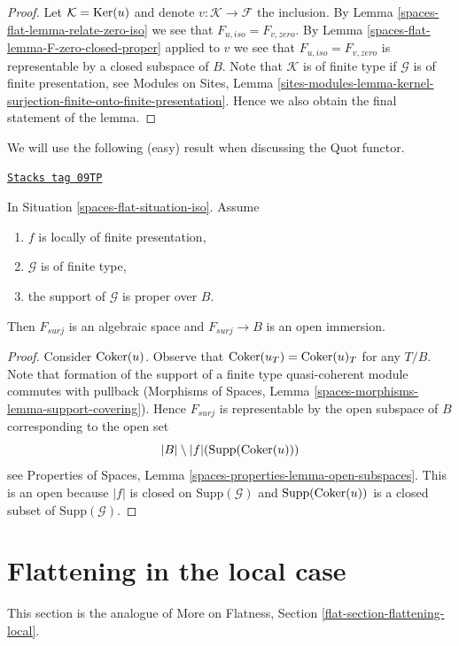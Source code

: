 \begin{proof}
Let $\mathcal{K} = \operatorname{Ker}(u)$ and denote $v : \mathcal{K} \to \mathcal{F}$
the inclusion. By Lemma \ref{spaces-flat-lemma-relate-zero-iso} we see that
$F_{u, iso} = F_{v, zero}$. By Lemma \ref{spaces-flat-lemma-F-zero-closed-proper}
applied to $v$ we see that $F_{u, iso} = F_{v, zero}$ is representable
by a closed subspace of $B$. Note that $\mathcal{K}$ is of finite type
if $\mathcal{G}$ is of finite presentation, see
Modules on Sites, Lemma
\ref{sites-modules-lemma-kernel-surjection-finite-onto-finite-presentation}.
Hence we also obtain the final statement of the lemma.
\end{proof}

We will use the following (easy) result when discussing the Quot functor.

\begin{lemma}
\label{spaces-flat-lemma-F-surj-open}
\href{https://stacks.math.columbia.edu/tag/09TP}{\texttt{Stacks tag 09TP}}

In Situation \ref{spaces-flat-situation-iso}. Assume
\begin{enumerate}
\item $f$ is locally of finite presentation,
\item $\mathcal{G}$ is of finite type,
\item the support of $\mathcal{G}$ is proper over $B$.
\end{enumerate}
Then $F_{surj}$ is an algebraic space and $F_{surj} \to B$
is an open immersion.
\end{lemma}

\begin{proof}
Consider $\operatorname{Coker}(u)$. Observe that
$\operatorname{Coker}(u_T) = \operatorname{Coker}(u)_T$ for any $T/B$.
Note that formation of the support of a finite type
quasi-coherent module commutes with pullback
(Morphisms of Spaces, Lemma \ref{spaces-morphisms-lemma-support-covering}).
Hence $F_{surj}$ is representable by the open subspace of $B$
corresponding to the open set
$$
|B| \setminus |f|(\text{Supp}(\operatorname{Coker}(u)))
$$
see Properties of Spaces, Lemma \ref{spaces-properties-lemma-open-subspaces}.
This is an open because $|f|$ is closed on $\text{Supp}(\mathcal{G})$
and $\text{Supp}(\operatorname{Coker}(u))$ is a closed subset of
$\text{Supp}(\mathcal{G})$.
\end{proof}

\section{Flattening in the local case}
\label{spaces-flat-section-flattening-local}
This section is the analogue of More on Flatness, Section
\ref{flat-section-flattening-local}.

